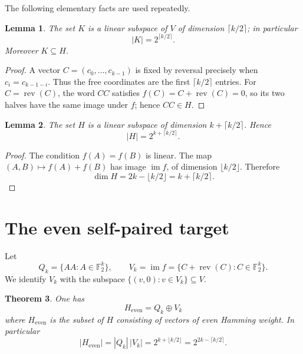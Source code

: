 \documentclass[11pt]{article}
\newtheorem{theorem}{Theorem}[section]
\newtheorem{lemma}[theorem]{Lemma}
\theoremstyle{definition}
\theoremstyle{remark}
\begin{document}
The following elementary facts are used repeatedly.

\begin{lemma}\label{lem:K}
The set $K$ is a linear subspace of $V$ of dimension $\lceil k/2\rceil$; in particular
\[
|K|=2^{\lceil k/2\rceil}.
\]
Moreover $K\subseteq H$.
\end{lemma}

\begin{proof}
A vector $C=(c_0,\ldots,c_{k-1})$ is fixed by reversal precisely when $c_i=c_{k-1-i}$. Thus the free coordinates are the first $\lceil k/2\rceil$ entries. For $C=\operatorname{rev}(C)$, the word $CC$ satisfies $f(C)=C+\operatorname{rev}(C)=0$, so its two halves have the same image under $f$; hence $CC\in H$.
\end{proof}

\begin{lemma}\label{lem:H}
The set $H$ is a linear subspace of dimension $k+\lceil k/2\rceil$. Hence
\[
|H|=2^{k+\lceil k/2\rceil}.
\]
\end{lemma}

\begin{proof}
The condition $f(A)=f(B)$ is linear. The map $(A,B)\mapsto f(A)+f(B)$ has image $\operatorname{im} f$, of dimension $\lfloor k/2\rfloor$. Therefore
\[
\dim H=2k-\lfloor k/2\rfloor=k+\lceil k/2\rceil.
\]
\end{proof}

\section{The even self-paired target}
\label{sec:Heven}

Let
\[
Q_k=\{AA:A\in\mathbb F_2^k\},\qquad
V_k=\operatorname{im} f=\{C+\operatorname{rev}(C):C\in\mathbb F_2^k\}.
\]
We identify $V_k$ with the subspace $\{(v,0):v\in V_k\}\subseteq V$.

\begin{theorem}\label{thm:Heven}
One has
\[
\boxed{\,H_{\mathrm{even}}=Q_k\oplus V_k\,}
\]
where $H_{\mathrm{even}}$ is the subset of $H$ consisting of vectors of even Hamming weight. In particular
\[
|H_{\mathrm{even}}|
=
|Q_k|\,|V_k|
=
2^{k+\lfloor k/2\rfloor}
=
2^{2k-\lceil k/2\rceil}.
\]
\end{theorem}
\end{document}
